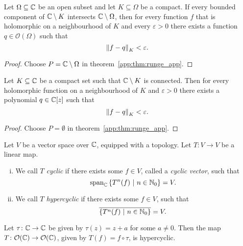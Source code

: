 \begin{izrek}
Let $\Omega \subseteq \mathbb{C}$ be an open subset and let
$K \subseteq \Omega$ be a compact. If every bounded component of
$\mathbb{C} \setminus K$ intersects $\mathbb{C} \setminus \Omega$, then for every
function $f$ that is holomorphic on a neighbourhood of $K$ and
every $\varepsilon > 0$ there exists a function
$q \in \mathcal{O}(\Omega)$ such that
\[
\left\lVert f - q\right\rVert_K < \varepsilon.
\]
\end{izrek}

\begin{proof}
Choose $P = \mathbb{C} \setminus \Omega$ in
theorem~\ref{app:thm:runge_app}.
\end{proof}

\begin{posledica}
Let $K \subseteq \mathbb{C}$ be a compact set such that $\mathbb{C} \setminus K$ is
connected. Then for every holomorphic function on a neighbourhood
of $K$ and $\varepsilon > 0$ there exists a polynomial
$q \in \mathbb{C}[z]$ such that
\[
\left\lVert f - q\right\rVert_K < \varepsilon.
\]
\end{posledica}

\begin{proof}
Choose $P = \emptyset$ in theorem~\ref{app:thm:runge_app}.
\end{proof}


\begin{definicija}
Let $V$ be a vector space over $\mathbb{C}$, equipped with a topology. Let
$T \colon V \to V$ be a linear map.

\begin{enumerate}[i)]
\item We call $T$ \emph{cyclic} if there exists
some $f \in V$, called a \emph{cyclic vector},
such that
\[
\operatorname{span}_{\mathbb{C}} \left\{T^n(f)~\middle\vert~n \in \mathbb{N}_0\right\} = V.
\]
\item We call $T$ \emph{hypercyclic} if
there exists some $f \in V$, such that
\[
\overline{\left\{T^n(f)~\middle\vert~n \in \mathbb{N}_0\right\}} = V.
\]
\end{enumerate}
\end{definicija}

\begin{izrek}[Birkhoff]
Let $\tau \colon \mathbb{C} \to \mathbb{C}$ be given by $\tau(z) = z + a$ for some
$a \ne 0$. Then the map
$T \colon \mathcal{O}(\mathbb{C}) \to \mathcal{O}(\mathbb{C})$, given by
$T(f) = f \circ \tau$, is hypercyclic.
\end{izrek}

